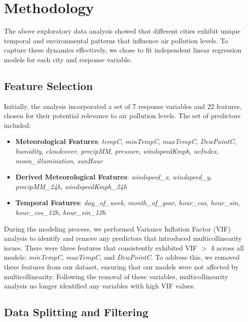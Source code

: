 \documentclass[twoside,11pt]{article}
\begin{document}
\section{Methodology}

The above exploratory data analysis showed that different cities exhibit unique temporal and environmental patterns that influence air pollution levels. To capture these dynamics effectively, we chose to fit independent linear regression models for each city and response variable.

\subsection{Feature Selection} \label{subsection:feature_selection}

Initially, the analysis incorporated a set of 7 response variables and 22 features, chosen for their potential relevance to air pollution levels. The set of predictors included:

\begin{itemize}
  \item \textbf{Meteorological Features}: \textit{tempC}, \textit{minTempC}, \textit{maxTempC}, \textit{DewPointC}, \textit{humidity}, \textit{cloudcover}, \textit{precipMM}, \textit{pressure}, \textit{windspeedKmph}, \textit{uvIndex}, \textit{moon\_illumination}, \textit{sunHour}
  \item \textbf{Derived Meteorological Features}: \textit{windspeed\_x}, \textit{windspeed\_y}, \textit{precipMM\_24h}, \textit{windspeedKmph\_24h}
  \item \textbf{Temporal Features}: \textit{day\_of\_week}, \textit{month\_of\_year}, \textit{hour\_cos}, \textit{hour\_sin}, \textit{hour\_cos\_12h}, \textit{hour\_sin\_12h}
\end{itemize}

During the modeling process, we performed Variance Inflation Factor (VIF) analysis to identify and remove any predictors that introduced multicollinearity issues. There were three features that consistently exhibited VIF $>$ 4 across all models: \textit{minTempC}, \textit{maxTempC}, and \textit{DewPointC}. To address this, we removed these features from our dataset, ensuring that our models were not affected by multicollinearity. Following the removal of these variables, multicollinearity analysis no longer identified any variables with high VIF values.

\subsection{Data Splitting and Filtering}
\end{document}
